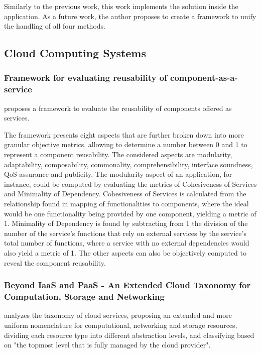 Similarly to the previous work, this work implements the solution inside the application. As a future work, the author proposes to create a framework to unify the handling of all four methods.

\subsection{Cloud Computing Systems}

\subsubsection{Framework for evaluating reusability of component-as-a-service}

 proposes a framework to evaluate the reusability of components offered as services.

The framework presents eight aspects that are further broken down into more granular objective metrics, allowing to determine a number between 0 and 1 to represent a component reusability. The considered aspects are modularity, adaptability, composability, commonality, comprehensibility, interface soundness, QoS assurance and publicity. The modularity aspect of an application, for instance, could be computed by evaluating the metrics of Cohesiveness of Services and Minimality of Dependency. Cohesiveness of Services is calculated from the relationship found in mapping of functionalities to components, where the ideal would be one functionality being provided by one component, yielding a metric of 1. Minimality of Dependency is found by subtracting from 1 the division of the number of the service's functions that rely on external services by the service's total number of functions, where a service with no external dependencies would also yield a metric of 1. The other aspects can also be objectively computed to reveal the component reusability.

\subsubsection{Beyond IaaS and PaaS - An Extended Cloud Taxonomy for Computation, Storage and Networking}

 analyzes the taxonomy of cloud services, proposing an extended and more uniform nomenclature for computational, networking and storage resources, dividing each resource type into different abstraction levels, and classifying based on "the topmost level that is fully managed by the cloud provider".

